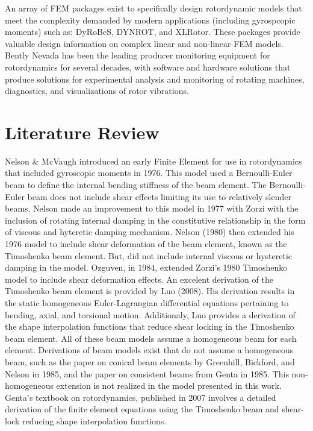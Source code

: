 An array of FEM packages exist to specifically design rotordynamic models that meet the complexity demanded by modern applications (including gyrospcopic moments) such as: DyRoBeS, DYNROT, and XLRotor. These packages provide valuable design information on complex linear and non-linear FEM models. Bently Nevada has been the leading producer monitoring equipment for rotordynamics for several decades, with software and hardware solutions that produce solutions for experimental analysis and monitoring of rotating machines, diagnostics, and visualizations of rotor vibrations.\par
\section{Literature Review}
Nelson \& McVaugh \cite{nelson1976dynamics} introduced an early Finite Element for use in rotordynamics that included gyroscopic moments in 1976. This model used a Bernoulli-Euler beam to define the internal bending stiffness of the beam element. The Bernoulli-Euler beam does not include shear effects limiting its use to relatively slender beams. Nelson made an improvement to this model in 1977 with Zorzi \cite{zorzi1977finite} with the inclusion of rotating internal damping in the constitutive relationship in the form of viscous and hyteretic damping mechanism. Nelson (1980)\cite{nelson1980finite} then extended his 1976 model to include shear deformation of the beam element, known as the Timoshenko beam element. But, did not include internal viscous or hysteretic damping in the model. Ozguven, in 1984\cite{ozguven1984whirl}, extended Zorzi's 1980 Timoshenko model to include shear deformation effects.  An excelent derivation of the Timoshenko beam element is provided by Luo (2008)\cite{luo2008efficient}. His derivation results in the static homogeneous Euler-Lagrangian differential equations pertaining to bending, axial, and torsional motion. Additionaly, Luo provides a derivation of the shape interpolation functions that reduce shear locking in the Timoshenko beam element. All of these beam models assume a homogeneous beam for each element. Derivations of beam models exist that do not assume a homogeneous beam, such as the paper on conical beam elements by Greenhill, Bickford, and Nelson in 1985\cite{greenhill1985conical}, and the paper on consistent beams from Genta in 1985\cite{genta1985consistent}. This non-homogeneous extension is not realized in the model presented in this work. Genta's textbook on rotordynamics, published in 2007\cite{genta2007dynamics} involves a detailed derivation of the finite element equations using the Timoshenko beam and shear-lock reducing shape interpolation functions.\par 
